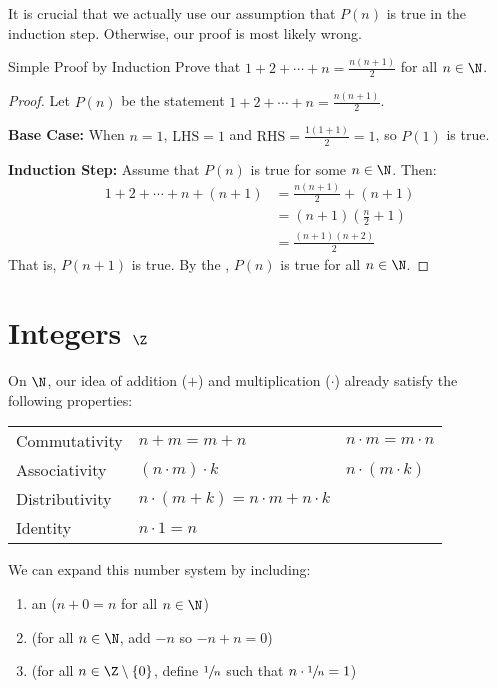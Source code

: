 \documentclass[12pt]{report}
\begin{document}
It is crucial that we actually use our assumption that $P(n)$ is true in the induction step. Otherwise, our proof is most likely wrong.

\begin{exbox}{Simple Proof by Induction}{}
    Prove that $1+2+\cdots + n = \frac{n(n+1)}{2}$ for all $n \in \N$.
    \tcblower
    \begin{proof}
        Let $P(n)$ be the statement $1 + 2 + \cdots + n = \frac{n(n+1)}{2}$.

        \textbf{Base Case:} When $n=1$, $\text{LHS} = 1$ and $\text{RHS} = \frac{1(1+1)}{2} = 1$, so $P(1)$ is true.

        \textbf{Induction Step:} Assume that $P(n)$ is true for some $n \in \N$. Then:
        \begin{align*}
            1 + 2 + \cdots + n + (n+1)
            &= \frac{n(n+1)}{2} + (n+1) \\
            &= (n+1) \left( \frac{n}{2} + 1 \right) \\
            &= \frac{(n+1)(n+2)}{2}
        \end{align*}
        That is, $P(n+1)$ is true. By the , $P(n)$ is true for all $n \in \N$.
    \end{proof}
\end{exbox}

\section{Integers $\Z$}
On $\N$, our idea of addition ($+$) and multiplication ($\cdot$) already satisfy the following properties:

\begin{tabular}{l l l}
    Commutativity & $n+m = m+n$ & $n \cdot m = m \cdot n$ \\
    Associativity & $(n \cdot m) \cdot k$ & $n \cdot (m \cdot k)$ \\
    Distributivity & $n \cdot (m + k) = n \cdot m + n \cdot k$ \\
    Identity & $n \cdot 1 = n$
\end{tabular}

We can expand this number system by including:
\begin{enumerate}
    \item an  ($n+0 = n$ for all $n \in \N$)
    \item {} (for all $n \in \N$, add $-n$ so $-n + n = 0$)
    \item {} (for all $n \in \Z \setminus \{0\}$, define $\sfrac{1}{n}$ such that $n \cdot \sfrac{1}{n} = 1$)
\end{enumerate}
\end{document}
